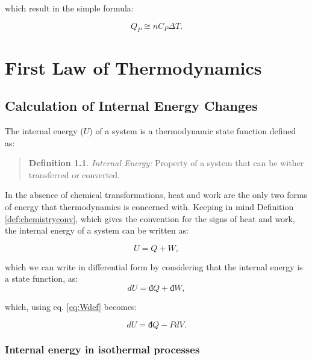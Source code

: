\documentclass[
  9pt,
]{extbook}
\theoremstyle{definition}
\newtheorem{definition}{Definition}[chapter]
\theoremstyle{definition}
\theoremstyle{definition}
\theoremstyle{remark}
\begin{document}
which result in the simple formula:

\begin{equation}
  Q_P \cong n C_P \Delta T.
  \label{eq:Cpint}
\end{equation}

\hypertarget{FirstLaw}{%
\chapter{First Law of Thermodynamics}\label{FirstLaw}}

\hypertarget{energyint}{%
\section{Calculation of Internal Energy Changes}\label{energyint}}

The internal energy (\(U\)) of a system is a thermodynamic state function defined as:

\begin{quote}
\begin{definition}
\protect\hypertarget{def:energy}{}{\label{def:energy} }\emph{Internal Energy:} Property of a system that can be wither transferred or converted.
\end{definition}
\end{quote}

In the absence of chemical transformations, heat and work are the only two forms of energy that thermodynamics is concerned with. Keeping in mind Definition \ref{def:chemistryconv}, which gives the convention for the signs of heat and work, the internal energy of a system can be written as:

\begin{equation}
  U = Q + W,
  \label{eq:U}
\end{equation}

which we can write in differential form by considering that the internal energy is a state function, as:
\begin{equation}
  dU = đ Q + đ W,
  \label{eq:dU}
\end{equation}

which, using eq. \eqref{eq:Wdef} becomes:

\begin{equation}
  dU = đ Q - PdV.
  \label{eq:dUpdv}
\end{equation}

\hypertarget{isothermalE}{%
\subsection{Internal energy in isothermal processes}\label{isothermalE}}
\end{document}
